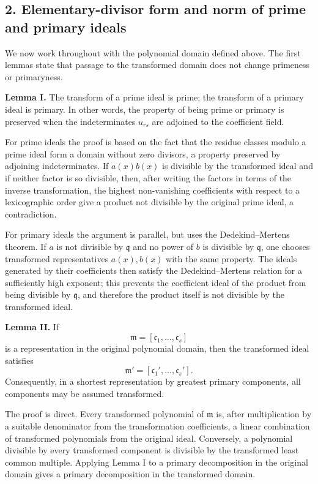 \documentclass[12pt]{article}
\begin{document}
\subsection{2. Elementary-divisor form and norm of prime and primary ideals}

We now work throughout with the polynomial domain defined above. The first lemmas state that passage to the transformed domain does not change primeness or primaryness.

\textbf{Lemma I.} The transform of a prime ideal is prime; the transform of a primary ideal is primary. In other words, the property of being prime or primary is preserved when the indeterminates $u_{rs}$ are adjoined to the coefficient field.

For prime ideals the proof is based on the fact that the residue classes modulo a prime ideal form a domain without zero divisors, a property preserved by adjoining indeterminates. If $a(x)b(x)$ is divisible by the transformed ideal and if neither factor is so divisible, then, after writing the factors in terms of the inverse transformation, the highest non-vanishing coefficients with respect to a lexicographic order give a product not divisible by the original prime ideal, a contradiction.

For primary ideals the argument is parallel, but uses the Dedekind--Mertens theorem. If $a$ is not divisible by $\mathfrak q$ and no power of $b$ is divisible by $\mathfrak q$, one chooses transformed representatives $a(x),b(x)$ with the same property. The ideals generated by their coefficients then satisfy the Dedekind--Mertens relation for a sufficiently high exponent; this prevents the coefficient ideal of the product from being divisible by $\mathfrak q$, and therefore the product itself is not divisible by the transformed ideal.

\textbf{Lemma II.} If
\[
  \mathfrak m=[\mathfrak c_1,\ldots,\mathfrak c_s]
\]
is a representation in the original polynomial domain, then the transformed ideal satisfies
\[
  \mathfrak m'=[\mathfrak c_1',\ldots,\mathfrak c_s'].
\]
Consequently, in a shortest representation by greatest primary components, all components may be assumed transformed.

The proof is direct. Every transformed polynomial of $\mathfrak m$ is, after multiplication by a suitable denominator from the transformation coefficients, a linear combination of transformed polynomials from the original ideal. Conversely, a polynomial divisible by every transformed component is divisible by the transformed least common multiple. Applying Lemma I to a primary decomposition in the original domain gives a primary decomposition in the transformed domain.
\end{document}
